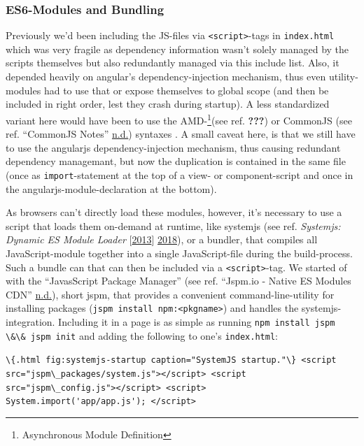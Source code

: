 \documentclass[a4paper,,tablecaptionabove]{scrbook}
\newcommand{\passthrough}[1]{#1}
\begin{document}
\hypertarget{es6-modules-and-bundling}{%
\subsubsection{ES6-Modules and
Bundling}\label{es6-modules-and-bundling}}

Previously we'd been including the JS-files via
\passthrough{\lstinline!<script>!}-tags in
\passthrough{\lstinline!index.html!} which was very fragile as
dependency information wasn't solely managed by the scripts themselves
but also redundantly managed via this include list. Also, it depended
heavily on angular's dependency-injection mechanism, thus even
utility-modules had to use that or expose themselves to global scope
(and then be included in right order, lest they crash during startup). A
less standardized variant here would have been to use the AMD-\footnote{Asynchronous
  Module Definition}(see ref. {\textbf{???}}) or CommonJS (see ref.
``CommonJS Notes'' \protect\hyperlink{ref-CommonJSNotes}{n.d.}) syntaxes
. A small caveat here, is that we still have to use the angularjs
dependency-injection mechanism, thus causing redundant dependency
managemant, but now the duplication is contained in the same file (once
as \passthrough{\lstinline!import!}-statement at the top of a view- or
component-script and once in the angularjs-module-declaration at the
bottom).

As browsers can't directly load these modules, however, it's necessary
to use a script that loads them on-demand at runtime, like systemjs (see
ref. \emph{Systemjs: Dynamic ES Module Loader}
{[}\protect\hyperlink{ref-systemjsDynamicES2018}{2013}{]}
\protect\hyperlink{ref-systemjsDynamicES2018}{2018}), or a bundler, that
compiles all JavaScript-module together into a single JavaScript-file
during the build-process. Such a bundle can that can then be included
via a \passthrough{\lstinline!<script>!}-tag. We started of with the
\enquote{JavasScript Package Manager} (see ref. ``Jspm.io - Native ES
Modules CDN'' \protect\hyperlink{ref-jspmioNative}{n.d.}), short jspm,
that provides a convenient command-line-utility for installing packages
(\passthrough{\lstinline!jspm install npm:<pkgname>!}) and handles the
systemjs-integration. Including it in a page is as simple as running
\passthrough{\lstinline!npm install jspm \&\& jspm init!} and adding the
following to one's \passthrough{\lstinline!index.html!}:

\passthrough{\lstinline!\{.html fig:systemjs-startup caption="SystemJS startup."\} <script src="jspm\_packages/system.js"></script> <script src="jspm\_config.js"></script> <script>   System.import('app/app.js'); </script>!}
\end{document}
